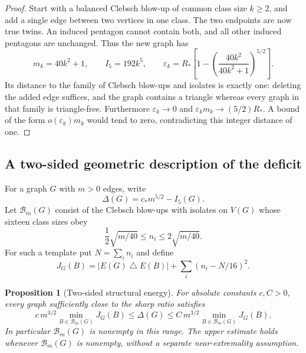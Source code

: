 \documentclass[11pt]{amsart}
\newtheorem{proposition}[theorem]{Proposition}
\theoremstyle{definition}
\theoremstyle{remark}
\begin{document}
\begin{proof}
Start with a balanced Clebsch blow-up of common class size $k\geq2$, and
add a single edge between two vertices in one class. The two endpoints are
now true twins. An induced pentagon cannot contain both, and all other
induced pentagons are unchanged. Thus the new graph has
\[
 m_k=40k^2+1,\qquad I_5=192k^5,\qquad
 \varepsilon_k=R_\ast\left[1-\left(\frac{40k^2}{40k^2+1}\right)^{5/2}\right].
\]
Its distance to the family of Clebsch blow-ups and isolates is exactly one:
deleting the added edge suffices, and the graph contains a triangle whereas
every graph in that family is triangle-free. Furthermore $\varepsilon_k\to0$
and $\varepsilon_km_k\to(5/2)R_\ast$. A bound of the form
$o(\varepsilon_k)m_k$ would tend to zero, contradicting this integer
distance of one.
\end{proof}

\subsection{A two-sided geometric description of the deficit}
For a graph $G$ with $m>0$ edges, write
\[
 \Delta(G)=c_\ast m^{5/2}-I_5(G).
\]
Let $\mathcal B_m(G)$ consist of the Clebsch blow-ups with isolates on
$V(G)$ whose sixteen class sizes obey
\[
 \frac12\sqrt{m/40}\leq n_i\leq2\sqrt{m/40}.
\]
For such a template put $N=\sum_i n_i$ and define
\[
 J_G(B)=|E(G)\mathbin{\triangle}E(B)|+\sum_i(n_i-N/16)^2.
\]

\begin{proposition}[Two-sided structural energy]\label{prop:structural-energy}
For absolute constants $c,C>0$, every graph sufficiently close to the sharp
ratio satisfies
\begin{equation}\tag{49}\label{eq:49}
 c\,m^{3/2}\min_{B\in\mathcal B_m(G)}J_G(B)
 \leq\Delta(G)\leq
 C\,m^{3/2}\min_{B\in\mathcal B_m(G)}J_G(B).
\end{equation}
In particular $\mathcal B_m(G)$ is nonempty in this range. The upper
estimate holds whenever $\mathcal B_m(G)$ is nonempty, without a separate
near-extremality assumption.
\end{proposition}
\end{document}
